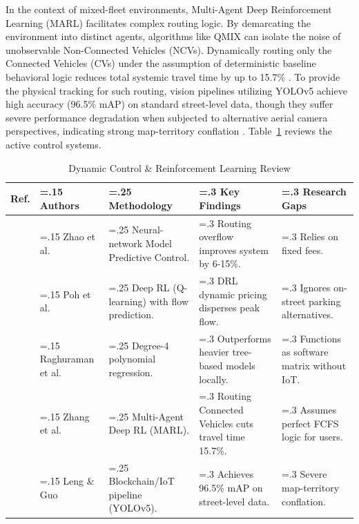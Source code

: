 \documentclass[conference]{IEEEtran}
\begin{document}
In the context of mixed-fleet environments, Multi-Agent Deep Reinforcement Learning (MARL) facilitates complex routing logic. By demarcating the environment into distinct agents, algorithms like QMIX can isolate the noise of unobservable Non-Connected Vehicles (NCVs). Dynamically routing only the Connected Vehicles (CVs) under the assumption of deterministic baseline behavioral logic reduces total systemic travel time by up to 15.7\% \cite{b23}. To provide the physical tracking for such routing, vision pipelines utilizing YOLOv5 achieve high accuracy (96.5\% mAP) on standard street-level data, though they suffer severe performance degradation when subjected to alternative aerial camera perspectives, indicating strong map-territory conflation \cite{b7}. Table~\ref{tab:dynamic_rl} reviews the active control systems.

\begin{table}[!htbp]
\caption{Dynamic Control \& Reinforcement Learning Review}
\label{tab:dynamic_rl}
\centering
\begin{tabularx}{\textwidth}{@{} l >{\hsize=.15\hsize}X >{\hsize=.25\hsize}X >{\hsize=.3\hsize}X >{\hsize=.3\hsize}X @{}}
\toprule
\textbf{Ref.} & \textbf{Authors} & \textbf{Methodology} & \textbf{Key Findings} & \textbf{Research Gaps} \\
\midrule
\cite{b22} & Zhao et al. & Neural-network Model Predictive Control. & Routing overflow improves system by 6-15\%. & Relies on fixed fees. \\
\cite{b11} & Poh et al. & Deep RL (Q-learning) with flow prediction. & DRL dynamic pricing disperses peak flow. & Ignores on-street parking alternatives. \\
\cite{b33} & Raghuraman et al. & Degree-4 polynomial regression. & Outperforms heavier tree-based models locally. & Functions as software matrix without IoT. \\
\cite{b23} & Zhang et al. & Multi-Agent Deep RL (MARL). & Routing Connected Vehicles cuts travel time 15.7\%. & Assumes perfect FCFS logic for users. \\
\cite{b7} & Leng \& Guo & Blockchain/IoT pipeline (YOLOv5). & Achieves 96.5\% mAP on street-level data. & Severe map-territory conflation. \\
\bottomrule
\end{tabularx}
\end{table}
\end{document}
